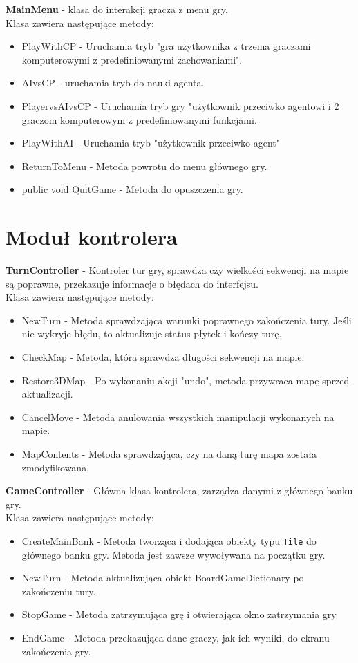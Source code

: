\documentclass[a4paper,twoside,12pt]{book}
\begin{document}
	
	\textbf{MainMenu} - klasa do interakcji gracza z menu gry.\\ Klasa zawiera następujące metody:
		\begin{itemize}
			\item PlayWithCP - Uruchamia tryb "gra użytkownika z trzema graczami komputerowymi z predefiniowanymi zachowaniami".
			\item AIvsCP - uruchamia tryb do nauki agenta.
			\item PlayervsAIvsCP - Uruchamia tryb gry "użytkownik przeciwko agentowi i 2 graczom komputerowym z predefiniowanymi funkcjami.
			\item PlayWithAI - Uruchamia tryb "użytkownik przeciwko agent"
			\item ReturnToMenu - Metoda powrotu do menu głównego gry.
			\item public void QuitGame - Metoda do opuszczenia gry.
		\end{itemize}
	
	\section{Moduł kontrolera}
	\textbf{TurnController} - Kontroler tur gry, sprawdza czy wielkości sekwencji na mapie są poprawne, przekazuje informacje o błędach do interfejsu.\\ Klasa zawiera następujące metody:
			\begin{itemize}
				\item NewTurn - Metoda sprawdzająca warunki poprawnego zakończenia tury. Jeśli nie wykryje błędu, to aktualizuje status płytek i kończy turę. 
				\item CheckMap - Metoda, która sprawdza długości sekwencji na mapie.
				\item Restore3DMap - Po wykonaniu akcji "undo", metoda przywraca mapę sprzed aktualizacji.
				\item CancelMove - Metoda anulowania wszystkich manipulacji wykonanych na mapie.
				\item MapContents - Metoda sprawdzająca, czy na daną turę mapa została zmodyfikowana.
				
			\end{itemize}
	
	
	\textbf{GameController} - Główna klasa kontrolera, zarządza danymi z głównego banku gry.\\ Klasa zawiera następujące metody:
			\begin{itemize}
				\item CreateMainBank - Metoda tworząca i dodająca obiekty typu \texttt{Tile} do głównego banku gry. Metoda jest zawsze wywoływana na początku gry.
				\item NewTurn - Metoda aktualizująca obiekt BoardGameDictionary po zakończeniu tury.
				\item StopGame - Metoda zatrzymująca grę i otwierająca okno zatrzymania gry
				\item EndGame - Metoda przekazująca dane graczy, jak ich wyniki, do ekranu zakończenia gry.
			\end{itemize}
	
\end{document}

